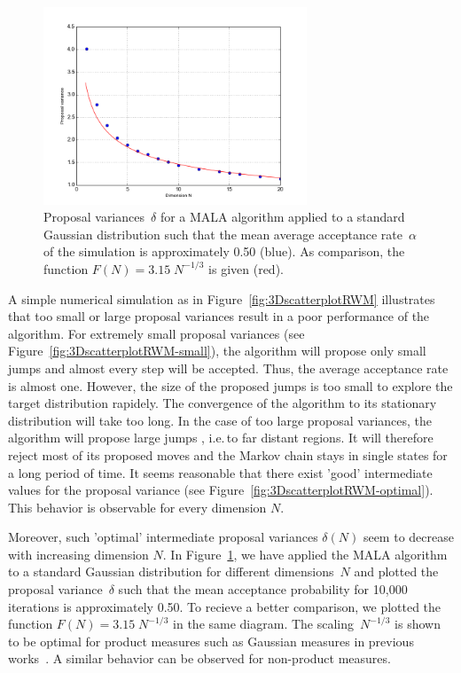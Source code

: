 \begin{figure}[htb]
\begin{center}
  \includegraphics[width=0.7\textwidth]{proposalvariancesForDimensions}
\end{center}
  \caption{Proposal variances~$\delta$ for a MALA algorithm applied to a standard Gaussian distribution such that the mean average acceptance rate~$\alpha$ of the simulation is approximately 0.50 (blue). As comparison, the function $F(N) = 3.15 \; N^{-1/3}$ is given (red).}
  \label{fig:proposalVarianceForDimensions}
\end{figure}

A simple numerical simulation as in Figure~\ref{fig:3DscatterplotRWM} illustrates that too small or large proposal variances result in a poor performance of the algorithm. For extremely small proposal variances (see Figure~\ref{fig:3DscatterplotRWM-small}), the algorithm will propose only small jumps and almost every step will be accepted. Thus, the average acceptance rate is almost one. However, the size of the proposed jumps is too small to explore the target distribution rapidely. The convergence of the algorithm to its stationary distribution will take too long. In the case of too large proposal variances, the algorithm will propose large jumps , i.e.\,to far distant regions. It will therefore reject most of its proposed moves and the Markov chain stays in single states for a long period of time. It seems reasonable that there exist 'good' intermediate values for the proposal variance (see Figure~\ref{fig:3DscatterplotRWM-optimal}). This behavior is observable for every dimension $N$.

Moreover, such 'optimal' intermediate proposal variances $ \delta(N) $ seem to decrease with increasing dimension $N$. In Figure~\ref{fig:proposalVarianceForDimensions}, we have applied the MALA algorithm to a standard Gaussian distribution for different dimensions~$N$ and plotted the proposal variance~$\delta$ such that the mean acceptance probability for 10,000 iterations is approximately 0.50. To recieve a better comparison, we plotted the function $F(N) = 3.15 \; N^{-1/3}$ in the same diagram. The scaling~$N^{- 1/3}$ is shown to be optimal for product measures such as Gaussian measures in previous works~\autocite{Roberts1997, Roberts1998}. A similar behavior can be observed for non-product measures.

